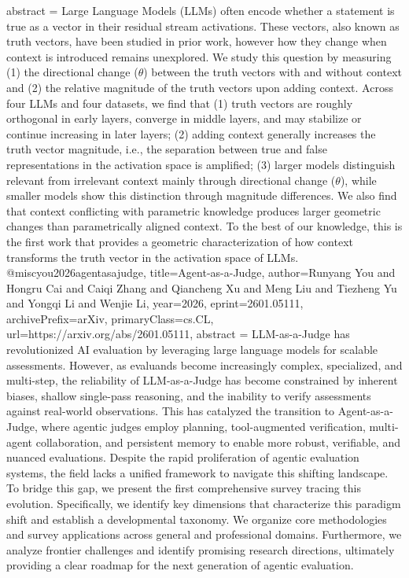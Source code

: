 {      abstract = {Large Language Models (LLMs) often encode whether a statement is true as a vector in their residual stream activations. These vectors, also known as truth vectors, have been studied in prior work, however how they change when context is introduced remains unexplored. We study this question by measuring (1) the directional change ($θ$) between the truth vectors with and without context and (2) the relative magnitude of the truth vectors upon adding context. Across four LLMs and four datasets, we find that (1) truth vectors are roughly orthogonal in early layers, converge in middle layers, and may stabilize or continue increasing in later layers; (2) adding context generally increases the truth vector magnitude, i.e., the separation between true and false representations in the activation space is amplified; (3) larger models distinguish relevant from irrelevant context mainly through directional change ($θ$), while smaller models show this distinction through magnitude differences. We also find that context conflicting with parametric knowledge produces larger geometric changes than parametrically aligned context. To the best of our knowledge, this is the first work that provides a geometric characterization of how context transforms the truth vector in the activation space of LLMs.}
}@misc{you2026agentasajudge,
      title={Agent-as-a-Judge}, 
      author={Runyang You and Hongru Cai and Caiqi Zhang and Qiancheng Xu and Meng Liu and Tiezheng Yu and Yongqi Li and Wenjie Li},
      year={2026},
      eprint={2601.05111},
      archivePrefix={arXiv},
      primaryClass={cs.CL},
      url={https://arxiv.org/abs/2601.05111},
      abstract = {LLM-as-a-Judge has revolutionized AI evaluation by leveraging large language models for scalable assessments. However, as evaluands become increasingly complex, specialized, and multi-step, the reliability of LLM-as-a-Judge has become constrained by inherent biases, shallow single-pass reasoning, and the inability to verify assessments against real-world observations. This has catalyzed the transition to Agent-as-a-Judge, where agentic judges employ planning, tool-augmented verification, multi-agent collaboration, and persistent memory to enable more robust, verifiable, and nuanced evaluations. Despite the rapid proliferation of agentic evaluation systems, the field lacks a unified framework to navigate this shifting landscape. To bridge this gap, we present the first comprehensive survey tracing this evolution. Specifically, we identify key dimensions that characterize this paradigm shift and establish a developmental taxonomy. We organize core methodologies and survey applications across general and professional domains. Furthermore, we analyze frontier challenges and identify promising research directions, ultimately providing a clear roadmap for the next generation of agentic evaluation.}
}
